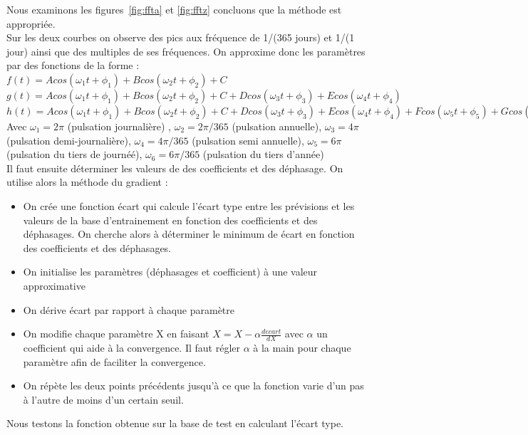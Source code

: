 \documentclass[11pt,a4paper]{article}
\begin{document}
Nous examinons les figures~\ref{fig:ffta} et \ref{fig:fftz} concluons que la méthode est appropriée. \\
Sur les deux courbes on observe des pics aux fréquence de 1/(365 jours) et 1/(1 jour) ainsi que des multiples de ses fréquences.
On approxime donc les paramètres par des fonctions de la forme : \\
 $f(t) = A cos (\omega_{1} t + \phi_{1}) + B cos (\omega_{2} t + \phi_{2}) + C$  \\
$g(t) = A cos (\omega_{1} t + \phi_{1}) + B cos (\omega_{2} t + \phi_{2}) + C + D cos (\omega_{3} t + \phi_{3}) + E cos (\omega_{4} t + \phi_{4})$ \\
$h(t) = A cos (\omega_{1} t + \phi_{1}) + B cos (\omega_{2} t + \phi_{2}) + C + D cos (\omega_{3} t + \phi_{3}) + E cos (\omega_{4} t + \phi_{4}) + F cos (\omega_{5} t + \phi_{5}) + G cos (\omega_{6} t + \phi_{6})$ \\ 
Avec $\omega_{1} = 2 \pi$ (pulsation journalière) , $\omega_{2} = 2 \pi /365$ (pulsation annuelle), $\omega_{3} = 4 \pi$ (pulsation demi-journalière), $\omega_{4} = 4\pi/365 $  (pulsation semi annuelle), $\omega_{5} = 6 \pi$ (pulsation du tiers de journéé), $\omega_{6} = 6\pi/365 $  (pulsation du tiers d'année)\\

Il faut ensuite déterminer les valeurs de des coefficients et des déphasage. On utilise alors la méthode du gradient :
\begin{itemize}
\item On crée une fonction écart qui calcule l'écart type entre les prévisions et les valeurs de la base d'entrainement en fonction des coefficients et des déphasages. On cherche alors à déterminer le minimum de écart en fonction des coefficients et des déphasages.
\item On initialise les paramètres (déphasages et coefficient) à une valeur approximative
\item On dérive écart par rapport à chaque paramètre
\item On modifie chaque paramètre X en faisant $ X = X - \alpha  \frac{d ecart}{dX} $ avec $ \alpha$ un coefficient qui aide à la convergence. Il faut régler $\alpha$ à la main pour chaque paramètre afin de faciliter la convergence.
\item On répète les deux points précédents jusqu'à ce que la fonction varie d'un pas à l'autre de moins d'un certain seuil.
\end{itemize}

Nous testons la fonction obtenue sur la base de test en calculant l'écart type.
\end{document}

